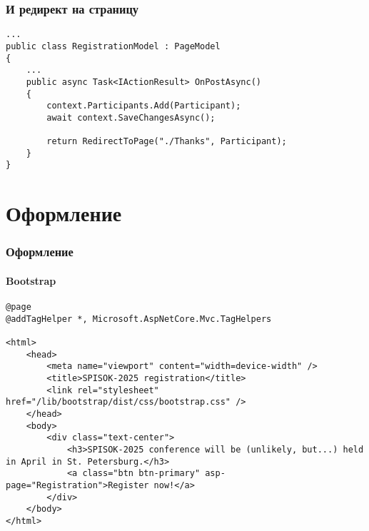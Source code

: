 \documentclass{../../slides-style}
\begin{document}
    \begin{frame}[fragile]
        \frametitle{И редирект на страницу}
        \begin{footnotesize}
            \begin{verbatim}
...
public class RegistrationModel : PageModel
{
    ...
    public async Task<IActionResult> OnPostAsync()
    {
        context.Participants.Add(Participant);
        await context.SaveChangesAsync();

        return RedirectToPage("./Thanks", Participant);
    }
}
            \end{verbatim}
        \end{footnotesize}
    \end{frame}

    \section{Оформление}

    \begin{frame}[fragile]
        \frametitle{Оформление}
        \framesubtitle{Bootstrap}
        \begin{scriptsize}
            \begin{verbatim}
@page
@addTagHelper *, Microsoft.AspNetCore.Mvc.TagHelpers

<html>
    <head>
        <meta name="viewport" content="width=device-width" />
        <title>SPISOK-2025 registration</title>
        <link rel="stylesheet" href="/lib/bootstrap/dist/css/bootstrap.css" />
    </head>
    <body>
        <div class="text-center">
            <h3>SPISOK-2025 conference will be (unlikely, but...) held in April in St. Petersburg.</h3>
            <a class="btn btn-primary" asp-page="Registration">Register now!</a>
        </div>
    </body>
</html>
            \end{verbatim}
        \end{scriptsize}
    \end{frame}
\end{document}
